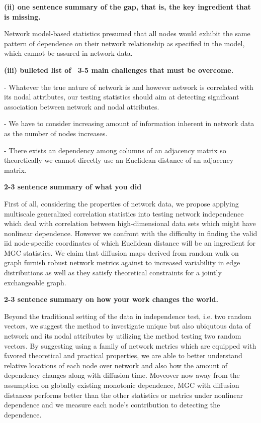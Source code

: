 \documentclass[12pt]{article}
\begin{document}
\begin{itemize}
\subitem \textbf{(ii) one sentence summary of the gap, that is, the key ingredient that is missing.}

 Network model-based statistics presumed that all nodes would exhibit the same pattern of dependence on their network relationship as specified in the model, which cannot be assured in network data.

\subitem \textbf{(iii) bulleted list of ~3-5 main challenges that must be overcome.}

\subsubitem -  Whatever the true nature of network is and however network is correlated with its nodal attributes, our testing statistics should aim at detecting significant association between network and nodal attributes.

\subsubitem - We have to consider increasing amount of information inherent in network data as the number of nodes increases. 

\subsubitem -  There exists an dependency among columns of an adjacency matrix so theoretically we cannot directly use an Euclidean distance of an adjacency matrix.


\subitem \textbf{2-3 sentence summary of what you did} 

First of all, considering the properties of network data, we propose applying multiscale generalized correlation statistics into testing network independence which deal with correlation between high-dimensional data sets which might have nonlinear dependence. However we confront with the difficulty in finding the valid iid node-specific coordinates of which Euclidean distance will be an ingredient for MGC statistics. We claim that diffusion maps derived from random walk on graph furnish robust network metrics against to increased variability in edge distributions as well as they satisfy theoretical constraints for a jointly exchangeable graph.


\subitem \textbf{2-3 sentence summary on how your work changes the world.}

Beyond the traditional setting of the data in independence test, i.e. two random vectors, we suggest the method to investigate unique but also ubiqutous data of network and its nodal attributes by utilizing the method testing two random vectors. By suggesting using a family of network metrics which are equipped with favored theoretical and practical properties, we are able to better understand relative locations of each node over network and also how the amount of dependency changes along with diffusion time. Moveover now away from the assumption on globally existing monotonic dependence, MGC with diffusion distances performs better than the other statistics or metrics under nonlinear dependence and we measure each node's contribution to detecting the dependence.


\end{itemize}
\end{document}
